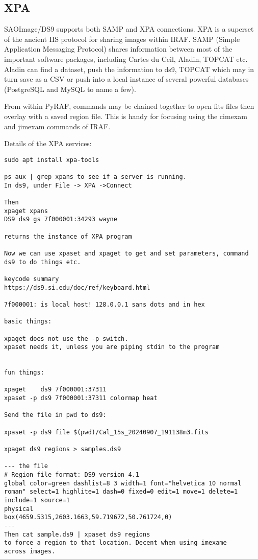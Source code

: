 \subsection{XPA}  \label{sec:XPA}

SAOImage/DS9 supports both SAMP and XPA connections. XPA is a
superset of the ancient IIS protocol for sharing images within IRAF.
SAMP (Simple Application Messaging Protocol) shares information
between most of the important software packages, including Cartes
du Ceil, Aladin, TOPCAT etc. Aladin can find a dataset, push the
information to ds9, TOPCAT which may in turn save as a CSV or
push into a local instance of several powerful databases (PostgreSQL
and MySQL to name a few). 

From within PyRAF, commands may be chained together to open fits files
then overlay with a saved region file. This is handy for focusing
using the cimexam and jimexam commands of IRAF.

Details of the XPA services:

\begingroup \fontsize{10pt}{10pt}
\selectfont
\begin{verbatim} 
sudo apt install xpa-tools

ps aux | grep xpans to see if a server is running.
In ds9, under File -> XPA ->Connect

Then 
xpaget xpans
DS9 ds9 gs 7f000001:34293 wayne

returns the instance of XPA program

Now we can use xpaset and xpaget to get and set parameters, command
ds9 to do things etc.

keycode summary
https://ds9.si.edu/doc/ref/keyboard.html

7f000001: is local host! 128.0.0.1 sans dots and in hex

basic things:

xpaget does not use the -p switch.
xpaset needs it, unless you are piping stdin to the program


fun things:

xpaget    ds9 7f000001:37311 
xpaset -p ds9 7f000001:37311 colormap heat

Send the file in pwd to ds9:

xpaset -p ds9 file $(pwd)/Cal_15s_20240907_191138m3.fits

xpaget ds9 regions > samples.ds9

--- the file
# Region file format: DS9 version 4.1
global color=green dashlist=8 3 width=1 font="helvetica 10 normal roman" select=1 highlite=1 dash=0 fixed=0 edit=1 move=1 delete=1 include=1 source=1
physical
box(4659.5315,2603.1663,59.719672,50.761724,0)
---
Then cat sample.ds9 | xpaset ds9 regions
to force a region to that location. Decent when using imexame
across images.

\end{verbatim}
\endgroup
